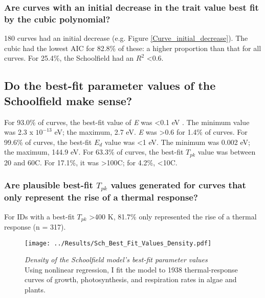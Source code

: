 \documentclass[11pt]{article}
\begin{document}
\subsubsection*{Are curves with an initial decrease in the trait value best fit by the cubic polynomial?}
180 curves had an initial decrease (e.g. Figure \ref{Curve_initial_decrease}). The cubic had the lowest AIC for 82.8\% of these: a higher proportion than that for all curves. For 25.4\%, the Schoolfield had an $R^{2}$ \textless 0.6.

\subsection*{Do the best-fit parameter values of the Schoolfield make sense?}
For 93.0\% of curves, the best-fit value of \textit{E} was \textless 0.1 eV %
. The minimum value was 2.3 x $10^{-13}$ eV; the maximum, 2.7 eV. \textit{E} was \textgreater 0.6 for 1.4\% of curves.
For 99.6\% of curves, the best-fit $E_{d}$ value was \textless 1 eV. The minimum was 0.002 eV; the maximum, 144.9 eV.
For 63.3\% of curves, the best-fit $T_{pk}$ value was between 20 and 60\degree C. For 17.1\%, it was \textgreater 100\degree C; for 4.2\%, \textless 10\degree C.


\subsubsection*{Are plausible best-fit $T_{pk}$ values generated for curves that only represent the rise of a thermal response?}
For IDs with a best-fit $T_{pk}$ \textgreater 400 K, 81.7\% only represented the rise of a thermal response (n = 317).

\begin{figure}[h]
	\centering
	\texttt{[image: ../Results/Sch\_Best\_Fit\_Values\_Density.pdf]}
	\caption{\textit{Density of the Schoolfield model's best-fit parameter values}\\
		Using nonlinear regression, I fit the model to 1938 thermal-response curves of growth, photosynthesis, and respiration rates in algae and plants. %
	}
	\label{Sch_best_fit_density}
\end{figure}
\end{document}
